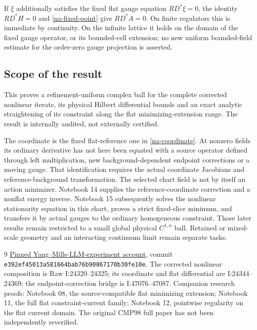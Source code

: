\documentclass[11pt]{article}
\theoremstyle{remark}
\begin{document}
If $\xi$ additionally satisfies the fixed flat gauge equation
$RD^*\xi=0$, the identity $RD^*H=0$ and
\eqref{na-fixed-point} give $RD^*A=0$. On finite regulators this
is immediate by continuity. On the infinite lattice it holds on the
domain of the fixed gauge operator, or its bounded-cell extension;
no new uniform bounded-field estimate for the order-zero gauge
projection is asserted.

\subsection{Scope of the result}
\label{na-scope}

This proves a refinement-uniform complex ball for the complete
corrected nonlinear iterate, its physical Hilbert differential
bounds and an exact analytic straightening of its constraint along
the flat minimizing-extension range. The result is internally
audited, not externally certified.

The coordinate is the fixed flat-reference one in
\eqref{na-coordinate}. At nonzero fields its ordinary derivative
has not here been equated with a source operator defined through
left multiplication, new background-dependent endpoint corrections
or a moving gauge. That identification requires the actual
coordinate Jacobians and reference-background transformation.
The selected chart field is not by itself an action minimizer.
Notebook 14 supplies the reference-coordinate correction and a
nonflat energy inverse. Notebook 15 subsequently solves the
nonlinear stationarity equation in this chart, proves a strict
fixed-slice minimum, and transfers it by actual gauges to the
ordinary homogeneous constraint. Those later results remain
restricted to a small global physical $C^{1,\alpha}$ ball.
Retained or mixed-scale geometry and an interacting continuum
limit remain separate tasks.

\begin{thebibliography}{9}
\href{https://github.com/ethanwsussman/Yang--Mills-LLM-experiment/tree/e392ef45013a581664bab76b90867170b30fe10e}
{Pinned Yang--Mills-LLM-experiment account}, commit
\texttt{e392ef4501\allowbreak 3a581664ba\allowbreak b76b908671\allowbreak 70b30fe10e}.
The corrected nonlinear composition is Raw I:24320--24325;
its coordinate and flat differential are I:24344--24369;
the endpoint-correction bridge is I:47076--47087.
Companion research proofs: Notebook 08, the source-compatible flat
minimizing extension; Notebook 11, the full flat constraint-current
family; Notebook 12, pointwise regularity on the flat current domain.
The original CMP98 full paper has not been independently reverified.
\end{thebibliography}
\end{document}
